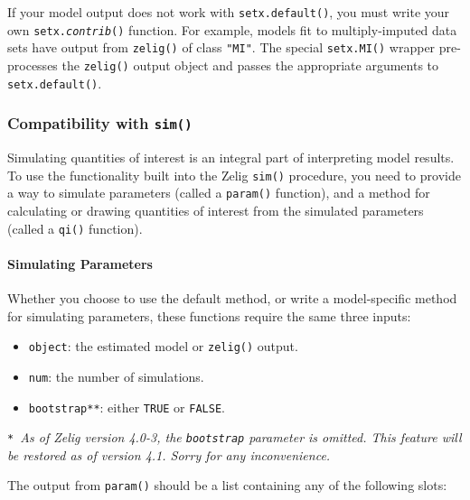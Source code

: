 If your model output does not work with {\tt setx.default()}, you must write your own {\tt setx.\emph{contrib}()} function.  For example, models fit to multiply-imputed data sets have output from {\tt zelig()} of class {\tt "MI"}.  The special {\tt setx.MI()} wrapper pre-processes the {\tt zelig()} output object and passes the appropriate arguments to {\tt setx.default()}.  



\subsubsection{Compatibility with {\tt sim()}}

Simulating quantities of interest is an integral part of interpreting model results.  To use the functionality built into the Zelig {\tt sim()} procedure, you need to provide a way to simulate parameters (called a {\tt param()} function), and a method for calculating or drawing quantities of interest from the simulated parameters (called a {\tt qi()} function).


\paragraph{Simulating Parameters}

Whether you choose to use the default method, or write a model-specific method for simulating parameters, these functions require the same three inputs:  

\begin{itemize}
	\item {\tt object}: the estimated model or {\tt zelig()} output.
	
	\item {\tt num}: the number of simulations.
	
	\item {\tt bootstrap**}: either {\tt TRUE} or {\tt FALSE}.  
\end{itemize}

{\tt** }\emph{As of Zelig version 4.0-3, the {\tt bootstrap} parameter is omitted. This feature will be restored as of version 4.1. Sorry for any inconvenience.}


The output from {\tt param()} should be a list containing any of the following slots:

